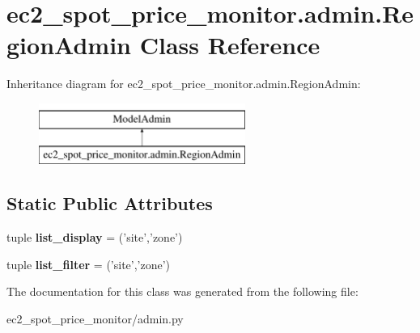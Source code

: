 \hypertarget{classec2__spot__price__monitor_1_1admin_1_1RegionAdmin}{\section{ec2\-\_\-spot\-\_\-price\-\_\-monitor.\-admin.\-Region\-Admin Class Reference}
\label{classec2__spot__price__monitor_1_1admin_1_1RegionAdmin}
}
Inheritance diagram for ec2\-\_\-spot\-\_\-price\-\_\-monitor.\-admin.\-Region\-Admin\-:\begin{figure}[H]
\begin{center}
\leavevmode
\includegraphics[height=2.000000cm]{classec2__spot__price__monitor_1_1admin_1_1RegionAdmin}
\end{center}
\end{figure}
\subsection*{Static Public Attributes}
\begin{DoxyCompactItemize}
\item 
\hypertarget{classec2__spot__price__monitor_1_1admin_1_1RegionAdmin_acb3550b11d4a941633747412b3a375b0}{tuple {\bfseries list\-\_\-display} = ('site','zone')}\label{classec2__spot__price__monitor_1_1admin_1_1RegionAdmin_acb3550b11d4a941633747412b3a375b0}

\item 
\hypertarget{classec2__spot__price__monitor_1_1admin_1_1RegionAdmin_a1676f0ec2767258e6775802129c14523}{tuple {\bfseries list\-\_\-filter} = ('site','zone')}\label{classec2__spot__price__monitor_1_1admin_1_1RegionAdmin_a1676f0ec2767258e6775802129c14523}

\end{DoxyCompactItemize}


The documentation for this class was generated from the following file\-:\begin{DoxyCompactItemize}
\item 
ec2\-\_\-spot\-\_\-price\-\_\-monitor/admin.\-py\end{DoxyCompactItemize}
